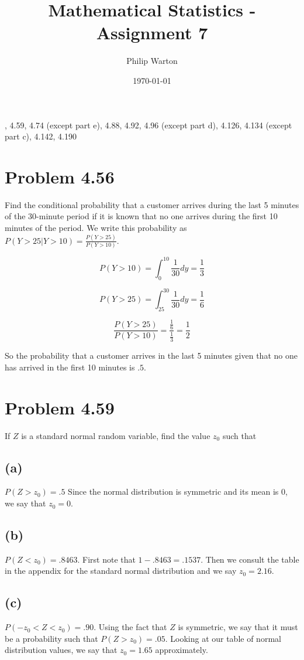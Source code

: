\documentclass{article}
\theoremstyle{definition}
\begin{document}
\title{Mathematical Statistics - Assignment 7}
\author{Philip Warton}
\date{\today}
, 4.59, 4.74 (except part e), 4.88, 4.92, 4.96 (except part d), 4.126, 4.134 (except part c), 4.142, 4.190
\section*{Problem 4.56}
    Find the conditional probability that a customer arrives during the last 5 minutes
    of the 30-minute period if it is known that no one arrives during the first 10 
    minutes of the period. We write this probability as $P(Y > 25 | Y > 10) = \frac
    {P(Y > 25)}{P(Y > 10)}$.

    \[
        P(Y > 10) = \int_0^10 \frac{1}{30} dy = \frac{1}{3}
    \]
    
    \[
        P(Y > 25) = \int_{25}^{30} \frac{1}{30} dy = \frac{1}{6}
    \]

    \[
        \frac{P(Y > 25)}{P(Y > 10)} = \frac{\frac{1}{6}}{\frac{1}{3}} = \frac{1}{2}
    \]

    So the probability that a customer arrives in the last 5 minutes given that no 
    one has arrived in the first 10 minutes is $.5$.

\section*{Problem 4.59}
    If $Z$ is a standard normal random variable, find the value $z_0$ such that

    \subsection*{(a)}
        $P(Z > z_0) = .5$ Since the normal distribution is symmetric and its mean
        is 0, we say that $z_0 = 0$.

    \subsection*{(b)}
        $P(Z < z_0) = .8463$. First note that $1 - .8463 = .1537$. Then we consult
        the table in the appendix for the standard normal distribution and we say
        $z_0 = 2.16$.

    \subsection*{(c)}
        $P(-z_0 < Z < z_0) = .90$. Using the fact that $Z$ is symmetric, we say that
        it must be a probability such that $P(Z > z_0) = .05$. Looking at our table
        of normal distribution values, we say that $z_0 = 1.65$ approximately.
\end{document}
